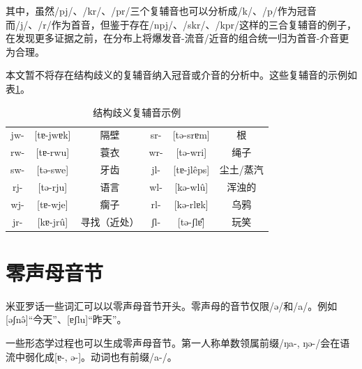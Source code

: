 其中，虽然/pj/、/kr/、/pr/三个复辅音也可以分析成/k/、/p/作为冠音而/j/、/r/作为首音，但鉴于存在/npj/、/skr/、/kpr/这样的三合复辅音的例子，在发现更多证据之前，在分布上将爆发音-流音/近音的组合统一归为首音-介音更为合理。

本文暂不将存在结构歧义的复辅音纳入冠音或介音的分析中。这些复辅音的示例如表\ref{ambiex}。

\begin{table}[H]
\vspace{5pt}
    \centering
    \caption{结构歧义复辅音示例}
    \label{ambiex}
\begin{tabular}{ccc|ccc}
     \toprule
jw- & {[}tɐ-jwɐk{]} & 隔壁     & sr- & {[}tə-srɐm{]}   & 根     \\
rw- & {[}tɐ-rwu{]}  & 蓑衣     & wr- & {[}tə-wri{]}    & 绳子    \\
sw- & {[}tə-swe{]}  & 牙齿     & jl- & {[}tɐ-jlêps{]} & 尘土/蒸汽 \\
rj- & {[}tə-rju{]}  & 语言     & wl- & {[}kə-wlû{]}   & 浑浊的   \\
wj- & {[}tɐ-wje{]}  & 瘸子     & rl- & {[}kə-rlɐk{]}   & 乌鸦    \\
jr- & {[}kɐ-jrû{]} & 寻找（近处） & ʃl- & {[}tə-ʃlɐ̂{]}   & 玩笑   \\ 
   \bottomrule
\end{tabular}
\end{table}

\section{零声母音节} \label{zero}

米亚罗话一些词汇可以以零声母音节开头。零声母的音节仅限/ə/和/a/。例如[əʃnə̂]“今天”、[ɐʃlu]“昨天”。

一些形态学过程也可以生成零声母音节。第一人称单数领属前缀/ŋa-, ŋə-/会在语流中弱化成[ɐ-, ə-]。动词也有前缀/a-/。